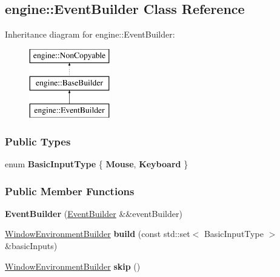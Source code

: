 \hypertarget{a00031}{}\subsection{engine\+:\+:Event\+Builder Class Reference}
\label{a00031}
Inheritance diagram for engine\+:\+:Event\+Builder\+:\begin{figure}[H]
\begin{center}
\leavevmode
\includegraphics[height=3.000000cm]{a00031}
\end{center}
\end{figure}
\subsubsection*{Public Types}
\begin{DoxyCompactItemize}
\item 
enum {\bfseries Basic\+Input\+Type} \{ {\bfseries Mouse}, 
{\bfseries Keyboard}
 \}\hypertarget{a00031_a6d136f2bc5e63ae4dc52882adcb48ab1}{}\label{a00031_a6d136f2bc5e63ae4dc52882adcb48ab1}

\end{DoxyCompactItemize}
\subsubsection*{Public Member Functions}
\begin{DoxyCompactItemize}
\item 
{\bfseries Event\+Builder} (\hyperlink{a00031}{Event\+Builder} \&\&event\+Builder)\hypertarget{a00031_a26eb2a8a814a70579f1ca30d245b2677}{}\label{a00031_a26eb2a8a814a70579f1ca30d245b2677}

\item 
\hyperlink{a00083}{Window\+Environment\+Builder} {\bfseries build} (const std\+::set$<$ Basic\+Input\+Type $>$ \&basic\+Inputs)\hypertarget{a00031_af77f14d7c5ff0be93dda1520f3441096}{}\label{a00031_af77f14d7c5ff0be93dda1520f3441096}

\item 
\hyperlink{a00083}{Window\+Environment\+Builder} {\bfseries skip} ()\hypertarget{a00031_a0c6c7712c1057dcb7e07a5aecfca5841}{}\label{a00031_a0c6c7712c1057dcb7e07a5aecfca5841}

\end{DoxyCompactItemize}
